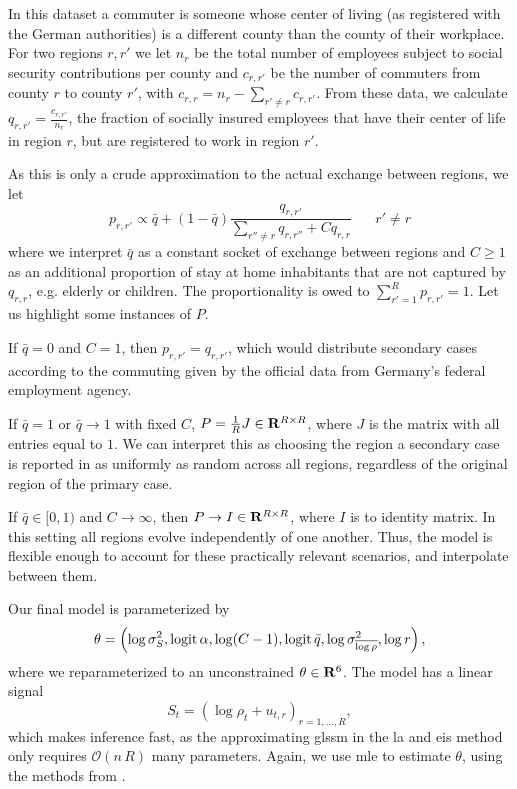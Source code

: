 In this dataset a commuter is someone whose center of living (as registered with the German authorities) is a different county than the county of their workplace.
For two regions $r,r'$ we let $n_{r}$ be the total number of employees subject to social security contributions per county and $c_{r,r'}$ be the number of commuters from county $r$ to county $r'$, with $c_{r,r} = n_{r} - \sum_{r'\neq r} c_{r,r'}$.
From these data, we calculate $q_{r,r'} = \frac{c_{r,r'}}{n_{r}}$, the fraction of socially insured employees that have their center of life in region $r$, but are registered to work in region $r'$. 

As this is only a crude approximation to the actual exchange between regions, we let
$$
    p_{r,r'} \propto \bar q + (1- \bar q) \frac{q_{r,r'}}{\sum_{r'' \neq r} q_{r,r''} + C q_{r,r}} \phantom{......} r' \neq r
$$
where we interpret $\bar q$ as a constant socket of exchange between regions and $C \geq 1$ as an additional proportion of stay at home inhabitants that are not captured by $q_{r,r}$, e.g. elderly or children. The proportionality is owed to $\sum_{r' = 1}^R p_{r,r'} = 1$. Let us highlight some instances of $P$.  

If $\bar q = 0$ and $C = 1$, then $p_{r,r'} = q_{r,r'}$, which would distribute secondary cases according to the commuting given by the official data from Germany's federal employment agency. 

If $\bar q = 1$ or $\bar q \to 1$ with fixed $C$, $P = \frac{1}{R}J\in\mathbf R^{R\times R}$, where $J$ is the matrix with all entries equal to $1$. We can interpret this as choosing the region a secondary case is reported in as uniformly as random across all regions, regardless of the original region of the primary case. 

If $\bar q \in [0,1)$ and $C \to \infty$, then $P \to I\in\mathbf R^{R \times R}$, where $I$ is to identity matrix. In this setting all regions evolve independently of one another.
Thus, the model is flexible enough to account for these practically relevant scenarios, and interpolate between them.

Our final model is parameterized by
$$
    \theta = \left( \log \sigma^{2}_S, \operatorname{logit} \alpha, \log (C - 1), \operatorname{logit} \bar q, \log \sigma^{2}_{\overline{\log \rho}}, \log r\right),
$$
where we reparameterized to an unconstrained $\theta \in \mathbf R^{6}$. The model has a linear signal 
$$
    S_{t} = \left(\log \rho_{t} + u_{t,r}\right)_{r = 1, \dots, R},
$$
which makes inference fast, as the approximating \acrshort{glssm} in the \acrshort{la} and \acrshort{eis} method only requires $\mathcal O(n\,R)$ many parameters. Again, we use \acrshort{mle} to estimate $\theta$, using the methods from .  

